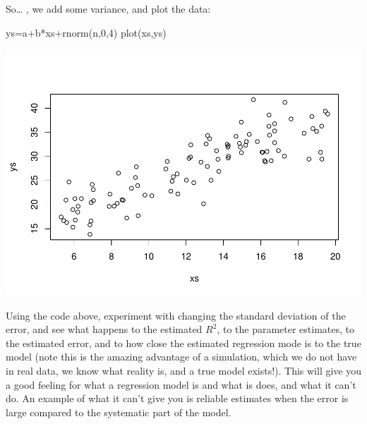 \documentclass[
]{book}
\newenvironment{Shaded}{\begin{snugshade}}{\end{snugshade}}
\newcommand{\DecValTok}[1]{\textcolor[rgb]{0.00,0.00,0.81}{#1}}
\newcommand{\FunctionTok}[1]{\textcolor[rgb]{0.00,0.00,0.00}{#1}}
\newcommand{\NormalTok}[1]{#1}
\newcommand{\OtherTok}[1]{\textcolor[rgb]{0.56,0.35,0.01}{#1}}
\newcommand{\SpecialCharTok}[1]{\textcolor[rgb]{0.00,0.00,0.00}{#1}}
\begin{document}
So\ldots{} , we add some variance, and plot the data:

\begin{Shaded}
\begin{Highlighting}[]
\NormalTok{ys}\OtherTok{=}\NormalTok{a}\SpecialCharTok{+}\NormalTok{b}\SpecialCharTok{*}\NormalTok{xs}\SpecialCharTok{+}\FunctionTok{rnorm}\NormalTok{(n,}\DecValTok{0}\NormalTok{,}\DecValTok{4}\NormalTok{)}
\FunctionTok{plot}\NormalTok{(xs,ys)}
\end{Highlighting}
\end{Shaded}

\includegraphics{ECOMODbook_files/figure-latex/a6.25-1.pdf}

Using the code above, experiment with changing the standard deviation of the error, and see what happens to the estimated \(R^2\), to the parameter estimates, to the estimated error, and to how close the estimated regression mode is to the true model (note this is the amazing advantage of a simulation, which we do not have in real data, we know what reality is, and a true model exists!). This will give you a good feeling for what a regression model is and what is does, and what it can't do. An example of what it can't give you is reliable estimates when the error is large compared to the systematic part of the model.
\end{document}
